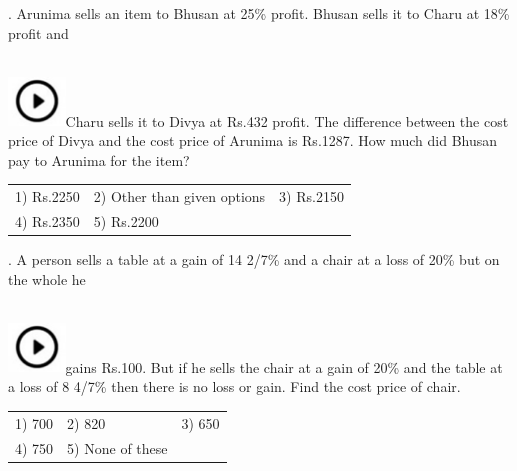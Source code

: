 \documentclass{article}
\begin{document}
	\noindent 
	
	\noindent 
	
	\noindent 
	
	\noindent 
	
	. Arunima sells an item to Bhusan at 25\% profit. Bhusan sells it to Charu at 18\% profit and
	
	\noindent \noindent \\ \includegraphics*[width=0.60in, height=0.52in]{images/image1}Charu sells it to Divya at Rs.432 profit. The difference between the cost price of Divya and the cost price of Arunima is Rs.1287. How much did Bhusan pay to Arunima for the item?
	
	\noindent 
	

		 
	\begin{tabular}{p{1.7in} p{1.6in} p{1.6in}} \\ 
 1) Rs.2250 & 2) Other than given options  & 3)  Rs.2150 
		\\
4) Rs.2350  & 5) Rs.2200  \\
\end{tabular}

	
	
	
	\noindent 
	
	\noindent 
	
	. A person sells a table at a gain of 14 2/7\% and a chair at a loss of 20\% but on the whole he
	
	\noindent 
	
	\noindent \noindent \\ \includegraphics*[width=0.60in, height=0.52in]{images/image1}gains Rs.100. But if he sells the chair at a gain of 20\% and the table at a loss of 8 4/7\% then there is no loss or gain. Find the cost price of chair.
	
	\noindent 
	
	\noindent  
	\begin{tabular}{p{1.7in} p{1.6in} p{1.6in}} \\ 
 1) 700                      & 2) 820               & 3) 650               \\
4) 750               & 5) None of these  \\
\end{tabular}
	
\end{document}
